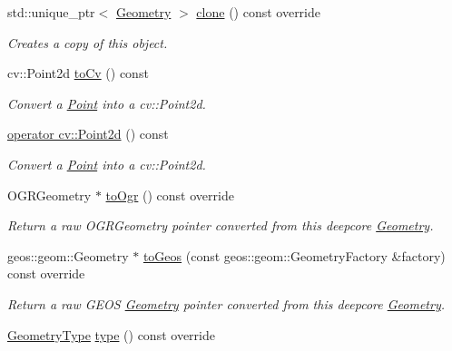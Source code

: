 \begin{DoxyCompactItemize}
std\+::unique\+\_\+ptr$<$ \hyperlink{structdg_1_1deepcore_1_1geometry_1_1_geometry}{Geometry} $>$ \hyperlink{structdg_1_1deepcore_1_1geometry_1_1_point_af62a4f1c9180391ef4b569b5abec2205}{clone} () const override
\begin{DoxyCompactList}\small\item\em Creates a copy of this object. \end{DoxyCompactList}\item 
cv\+::\+Point2d \hyperlink{structdg_1_1deepcore_1_1geometry_1_1_point_a24436c6329a8e973a3e7321afc7f3116}{to\+Cv} () const 
\begin{DoxyCompactList}\small\item\em Convert a \hyperlink{structdg_1_1deepcore_1_1geometry_1_1_point}{Point} into a cv\+::\+Point2d. \end{DoxyCompactList}\item 
\hyperlink{structdg_1_1deepcore_1_1geometry_1_1_point_adc8db52ca991b4f97dd809bed29560e9}{operator cv\+::\+Point2d} () const 
\begin{DoxyCompactList}\small\item\em Convert a \hyperlink{structdg_1_1deepcore_1_1geometry_1_1_point}{Point} into a cv\+::\+Point2d. \end{DoxyCompactList}\item 
O\+G\+R\+Geometry $\ast$ \hyperlink{structdg_1_1deepcore_1_1geometry_1_1_point_a036525feadf70f3b89f516aa18e42e0b}{to\+Ogr} () const override
\begin{DoxyCompactList}\small\item\em Return a raw O\+G\+R\+Geometry pointer converted from this deepcore \hyperlink{structdg_1_1deepcore_1_1geometry_1_1_geometry}{Geometry}. \end{DoxyCompactList}\item 
geos\+::geom\+::\+Geometry $\ast$ \hyperlink{structdg_1_1deepcore_1_1geometry_1_1_point_ab3a091753081d18b7da8583bdb721aa7}{to\+Geos} (const geos\+::geom\+::\+Geometry\+Factory \&factory) const override
\begin{DoxyCompactList}\small\item\em Return a raw G\+E\+OS \hyperlink{structdg_1_1deepcore_1_1geometry_1_1_geometry}{Geometry} pointer converted from this deepcore \hyperlink{structdg_1_1deepcore_1_1geometry_1_1_geometry}{Geometry}. \end{DoxyCompactList}\item 
\hyperlink{group___geometry_module_gad9a3ec0b998629dbcf8274512700964a}{Geometry\+Type} \hyperlink{structdg_1_1deepcore_1_1geometry_1_1_point_a7c01b33833b807cecda3610038f60a9d}{type} () const override

\end{DoxyCompactItemize}
